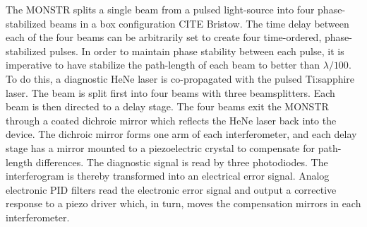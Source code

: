 \documentclass[letterpaper,12pt,amsmath,reprint,aip,jmp,twocolumn]{revtex4-1}
\begin{document}
\indent The MONSTR splits a single beam from a pulsed light-source into four phase-stabilized beams in a box configuration CITE Bristow. The time delay between each of the four beams can be arbitrarily set to create four time-ordered, phase-stabilized pulses. In order to maintain phase stability between each pulse, it is imperative to have stabilize the path-length of each beam to better than $\lambda/100$. To do this, a diagnostic HeNe laser is co-propagated with the pulsed Ti:sapphire laser. The beam is split first into four beams with three beamsplitters. Each beam is then directed to a delay stage. The four beams exit the MONSTR through a coated dichroic mirror which reflects the HeNe laser back into the device. The dichroic mirror forms one arm of each interferometer, and each delay stage has a mirror mounted to a piezoelectric crystal to compensate for path-length differences. The diagnostic signal is read by three photodiodes. The interferogram is thereby transformed into an electrical error signal. Analog electronic PID filters read the electronic error signal and output a corrective response to a piezo driver which, in turn, moves the compensation mirrors in each interferometer.
\end{document}

